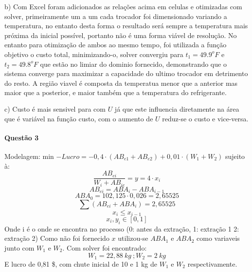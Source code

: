 \documentclass[]{article} %
\begin{document}
b) Com Excel foram adicionados as relações acima em celulas e otimizadas com solver, primeiramente um a um
cada trocador foi dimensionado variando a temperatura, no entanto desta forma o resultado será sempre a temperatura
mais próxima da inicial possível, portanto não é uma forma viável de resolução. No entanto para otimização de ambos
ao mesmo tempo, foi utilizada a função objetivo o custo total, minimizando-o, solver convergiu para \( t_1 = 49.9 ^o F\)
e \( t_2 = 49.8 ^o F\) que estão no limiar do dominio fornecido, demonstrando que o sistema converge para maximizar a capacidade
do ultimo trocador em detrimento do resto. A região viavel é composta da temperatua menor que a anterior mas maior que a posterior,
e maior também que a temperatura do refrigerante.

c) Custo é mais sensivel para com \( U \) já que este influencia diretamente na área que é variável na função custo,
com o aumento de \(U\) reduz-se o custo e vice-versa.

\paragraph{Questão 3}

Modelagem:
min \( - Lucro = - 0,4 \cdot (AB_{e1} + AB_{e2}) + 0,01 \cdot (W_{1} + W_2) \) sujeito à:
\[ \frac{AB_{ei}}{W_{i} + AB_{ie}} = y = 4 \cdot x_i \]
\[ AB_{ei} = ABA_i - ABA_{i-1} \]
\[ ABA_0 = 102,125 \cdot 0,026 = 2,65525 \]
\[ \sum ( AB_{ei} + ABA_i ) = 2,65525 \]
\[ x_i \leqslant x_{i - 1} \]
\[ {x_i, y_i} \in [0,1]  \]
Onde i é o onde se encontra no processo (0: antes da extração, 1: extração 1
2: extração 2) Como não foi fornecido \(x\) utilizou-se \(ABA_1\) e \(ABA_2\) como variaveis junto com
\(W_1\) e \(W_2\). Com solver foi encontrado:
\[ W_1 = 22,88 \ kg \ ; W_2 = 2 \ kg \]
E lucro de 0,81 \$, com chute inicial de 10 e 1 kg de \(W_1\) e \(W_2\) respectivamente.
\end{document}
